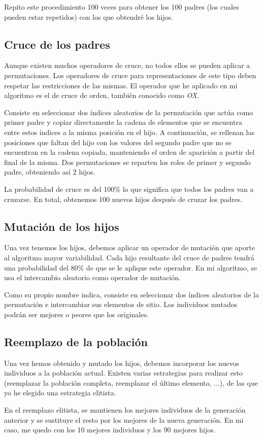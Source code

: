 Repito este procedimiento 100 veces para obtener los 100 padres (los cuales pueden estar repetidos) con los que obtendré los hijos.

\subsection{Cruce de los padres}
Aunque existen muchos operadores de cruce, no todos ellos se pueden aplicar a permutaciones. Los operadores de cruce para representaciones de este tipo deben respetar las restricciones de las mismas. El operador que he aplicado en mi algoritmo es el de cruce de orden, también conocido como \textit{OX}.

Consiste en seleccionar dos índices aleatorios de la permutación que actúa como primer padre y copiar directamente la cadena de elementos que se encuentra entre estos índices a la misma posición en el hijo. A continuación, se rellenan las posiciones que faltan del hijo con los valores del segundo padre que no se encuentran en la cadena copiada, manteniendo el orden de aparición a partir del final de la misma. Dos permutaciones se reparten los roles de primer y segundo padre, obteniendo así 2 hijos.

La probabilidad de cruce es del 100\% lo que significa que todos los padres van a cruzarse. En total, obtenemos 100 nuevos hijos después de cruzar los padres.

\subsection{Mutación de los hijos}
Una vez tenemos los hijos, debemos aplicar un operador de mutación que aporte al algoritmo mayor variabilidad. Cada hijo resultante del cruce de padres tendrá una probabilidad del 80\% de que se le aplique este operador. En mi algoritmo, se usa el intercambio aleatorio como operador de mutación.

Como su propio nombre indica, consiste en seleccionar dos índices aleatorios de la permutación e intercambiar sus elementos de sitio. Los individuos mutados podrán ser mejores o peores que los originales.

\subsection{Reemplazo de la población}
Una vez hemos obtenido y mutado los hijos, debemos incorporar los nuevos individuos a la población actual. Existen varias estrategias para realizar esto (reemplazar la población completa, reemplazar el último elemento, ...), de las que yo he elegido una estrategia elitista.

En el reemplazo elitista, se mantienen los mejores individuos de la generación anterior y se sustituye el resto por los mejores de la nueva generación. En mi caso, me quedo con los 10 mejores individuos y los 90 mejores hijos.